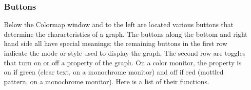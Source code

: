 \subsubsection{Buttons}

Below the Colormap window and to the left are located various
buttons that determine the characteristics of a graph.
The buttons along the bottom and right hand side all have special
meanings; the remaining buttons in the first row indicate the mode
or style used to display the graph.
The second row are toggles that turn on or off a property of the
graph.
On a color monitor, the property is on if green (clear text, on a
monochrome monitor) and off if red (mottled pattern, on a
monochrome monitor).
Here is a list of their functions.
%
